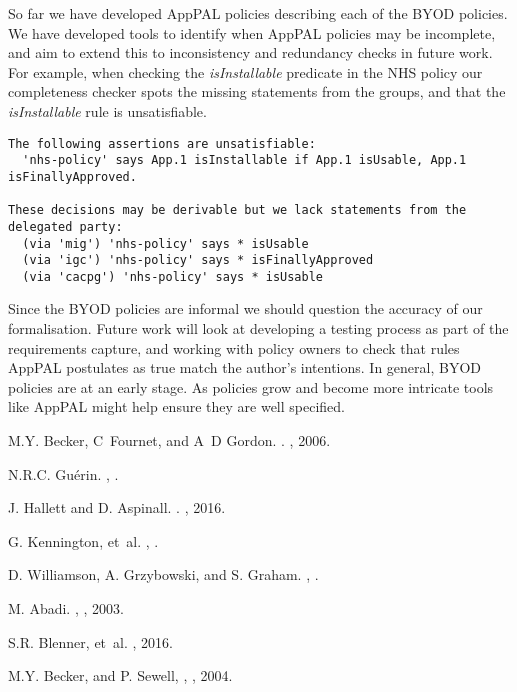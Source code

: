 \documentclass{easychair}
\begin{document}
So far we have developed AppPAL policies describing each of the BYOD policies.
We have developed tools to identify when AppPAL policies may be incomplete, and aim to extend this to inconsistency and redundancy checks in future work.
For example, when checking the \emph{isInstallable} predicate in the NHS policy our completeness checker spots the missing statements from the groups, and that the \emph{isInstallable} rule is unsatisfiable.
\begin{lstlisting}
The following assertions are unsatisfiable:
  'nhs-policy' says App.1 isInstallable if App.1 isUsable, App.1 isFinallyApproved.

These decisions may be derivable but we lack statements from the delegated party:
  (via 'mig') 'nhs-policy' says * isUsable
  (via 'igc') 'nhs-policy' says * isFinallyApproved
  (via 'cacpg') 'nhs-policy' says * isUsable
\end{lstlisting}
Since the BYOD policies are informal we should question the accuracy of our formalisation.
Future work will look at developing a testing process as part of the requirements capture, and working with policy owners to check that rules AppPAL postulates as true match the author's intentions.
In general, BYOD policies are at an early stage.
As policies grow and become more intricate tools like AppPAL might help ensure they are well specified.


\begin{thebibliography}{1}
M.Y. Becker, C~Fournet, and A~D Gordon.
.
, 2006.

N.R.C. Gu{\'e}rin.
,
.%

J. Hallett and D. Aspinall.
.
, 2016.

G. Kennington, et~al.
,
.%

D. Williamson, A. Grzybowski, and S. Graham.
,
.%

M. Abadi.
,
, 2003.

S.R. Blenner, et~al.
, 2016.

M.Y. Becker, and P. Sewell,
,
, 2004.
\end{thebibliography}
\end{document}

